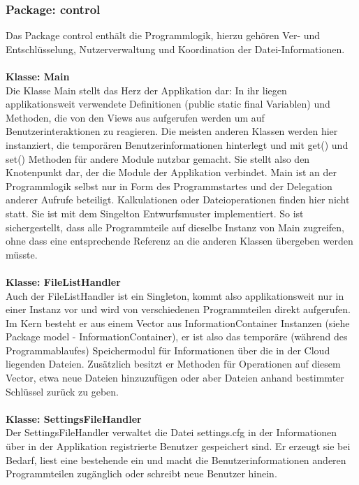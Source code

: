 \documentclass[13pt,a4paper,bibliography=totocnumbered,listof=totocnumbered]{scrartcl}
\begin{document}
\subsubsection{Package: control}
Das Package control enthält die Programmlogik, hierzu gehören Ver- und Entschlüsselung, Nutzerverwaltung und Koordination der Datei-Informationen.\\\\
\textbf{Klasse: Main}\\
Die Klasse Main stellt das Herz der Applikation dar: In ihr liegen applikationsweit verwendete Definitionen (public static final Variablen) und Methoden, die von den Views aus aufgerufen werden um auf Benutzerinteraktionen zu reagieren. Die meisten anderen Klassen werden hier instanziert, die temporären Benutzerinformationen hinterlegt und mit get() und set() Methoden für andere Module nutzbar gemacht. Sie stellt also den Knotenpunkt dar, der die Module der Applikation verbindet. Main ist an der Programmlogik selbst nur in Form des Programmstartes und der Delegation anderer Aufrufe beteiligt. Kalkulationen oder Dateioperationen finden hier nicht statt. Sie ist mit dem Singelton Entwurfsmuster implementiert. So ist sichergestellt, dass alle Programmteile auf dieselbe Instanz von Main zugreifen, ohne dass eine entsprechende Referenz an die anderen Klassen übergeben werden müsste.\\\\
\textbf{Klasse: FileListHandler}\\
Auch der FileListHandler ist ein Singleton, kommt also applikationsweit nur in einer Instanz vor und wird von verschiedenen Programmteilen direkt aufgerufen. Im Kern besteht er aus einem Vector aus InformationContainer Instanzen (siehe Package model - InformationContainer), er ist also das temporäre (während des Programmablaufes) Speichermodul für Informationen über die in der Cloud liegenden Dateien. Zusätzlich besitzt er Methoden für Operationen auf diesem Vector, etwa neue Dateien hinzuzufügen oder aber Dateien anhand bestimmter Schlüssel zurück zu geben.\\\\
\textbf{Klasse: SettingsFileHandler}\\
Der SettingsFileHandler verwaltet die Datei settings.cfg in der Informationen über in der Applikation registrierte Benutzer gespeichert sind. Er erzeugt sie bei Bedarf, liest eine bestehende ein und macht die Benutzerinformationen anderen Programmteilen zugänglich oder schreibt neue Benutzer hinein.\\\\
\end{document}
